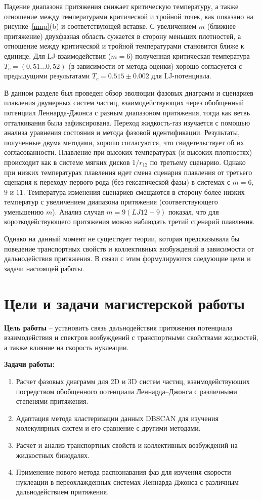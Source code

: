 Падение диапазона притяжения снижает критическую температуру, а также отношение между температурами критической и тройной точек, как показано на рисунке~\ref{nmp}(b) и соответствующей вставке. С увеличением $m$ (ближнее притяжение) двухфазная область сужается в сторону меньших плотностей, а отношение между критической и тройной температурами становится ближе к единице. Для LJ-взаимодействия ($m = 6$) полученная критическая температура $T_c=(0,51 . . . 0,52)$ (в зависимости от метода оценки) хорошо согласуется с предыдущими результатами $T_c = 0.515 \pm 0.002$  для LJ-потенциала.

В данном разделе был проведен обзор эволюции фазовых диаграмм и сценариев плавления двумерных систем частиц, взаимодействующих через обобщенный потенциал Леннарда-Джонса с разным диапазоном притяжения, тогда как ветвь отталкивания была зафиксирована. Переход жидкость-газ изучается с помощью анализа уравнения состояния и метода фазовой идентификации. Результаты, полученные двумя методами, хорошо согласуются, что свидетельствует об их согласованности. Плавление при высоких температурах (и высоких плотностях) происходит как в системе мягких дисков $1/r_{12}$ по третьему сценарию. Однако при низких температурах плавления идет смена сценария плавления от третьего сценария к переходу первого рода (без гексатической фазы) в системах с $m = 6$, $9$ и $11$. Температура изменения сценариев смещаются в сторону более низких температур с увеличением диапазона притяжения (соответствующего уменьшению $m$). Анализ случая $m = 9 (LJ12-9)$  показал, что для короткодействующего притяжения можно наблюдать третий сценарий плавления.

Однако на данный момент не существует теории, которая предсказывала бы поведение транспортных свойств и коллективных возбуждений в зависимости от дальнодействия притяжения. В связи с этим формулируются следующие цели и задачи настоящей работы.

\section{Цели и задачи магистерской работы}

\textbf{Цель работы} -- установить связь дальнодействия притяжения потенциала взаимодействия и спектров возбуждений с транспортными свойствами жидкостей, а также влияние на скорость нуклеации.

\textbf{Задачи работы:}
\begin{enumerate}
    \item Расчет фазовых диаграмм для 2D и 3D систем частиц, взаимодействующих посредством обобщенного потенциала Леннарда--Джонса с различными степенями притяжения.
    \item Адаптация метода кластеризации данных DBSCAN для изучения молекулярных систем и его сравнение с другими методами.
    \item Расчет и анализ транспортных свойств и коллективных возбуждений на жидкостных бинодалях.
    \item Применение нового метода распознавания фаз для изучения скорости нуклеации в переохлажденных системах Леннарда-Джонса с различным дальнодействием притяжения.
\end{enumerate}
